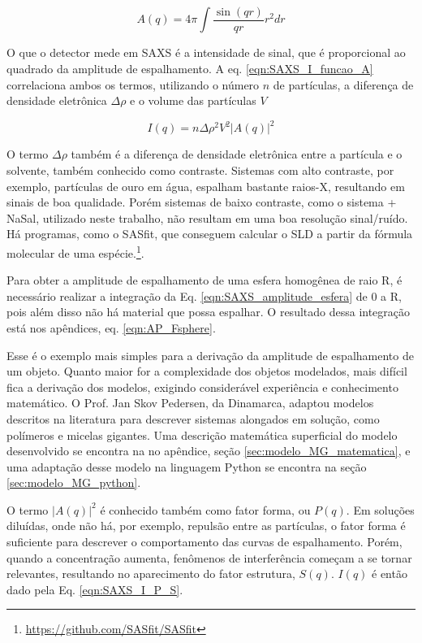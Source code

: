 		\begin{equation}
			A(q) = 4\pi \int \dfrac{\sin(qr)}{qr} r^2 dr
			\label{eqn:SAXS_amplitude_esfera}
		\end{equation}
		
		O que o detector mede em SAXS é a intensidade de sinal, que é proporcional ao quadrado da amplitude de espalhamento. A eq. \ref{eqn:SAXS_I_funcao_A} correlaciona ambos os termos, utilizando o número \(n\) de partículas, a diferença de densidade eletrônica \(\Delta \rho\) e o volume das partículas \(V\)
		
		\begin{equation}
			I(q) = n\Delta \rho^2 V^2 |A(q)|^2
			\label{eqn:SAXS_I_funcao_A}
		\end{equation}
		
		O termo \(\Delta \rho\) também é a diferença de densidade eletrônica entre a partícula e o solvente, também conhecido como contraste. Sistemas com alto contraste, por exemplo, partículas de ouro em água, espalham bastante raios-X, resultando em sinais de boa qualidade. Porém sistemas de baixo contraste, como o sistema \CTAB{} + NaSal, utilizado neste trabalho, não resultam em uma boa resolução sinal/ruído. Há programas, como o SASfit, que conseguem calcular o SLD a partir da fórmula molecular de uma espécie.\footnote{\url{https://github.com/SASfit/SASfit}}.
		
		Para obter a amplitude de espalhamento de uma esfera homogênea de raio R, é necessário realizar a integração da Eq. \ref{eqn:SAXS_amplitude_esfera} de 0 a R, pois além disso não há material que possa espalhar. O resultado dessa integração está nos apêndices, eq. \ref{eqn:AP_Fsphere}.
		
		Esse é o exemplo mais simples para a derivação da amplitude de espalhamento de um objeto. Quanto maior for a complexidade dos objetos modelados, mais difícil fica a derivação dos modelos, exigindo considerável experiência e conhecimento matemático. O Prof. Jan Skov Pedersen, da Dinamarca, adaptou modelos descritos na literatura para descrever sistemas alongados em solução, como polímeros e micelas gigantes. Uma descrição matemática superficial do modelo desenvolvido se encontra na no apêndice, seção \ref{sec:modelo_MG_matematica}, e uma adaptação desse modelo na linguagem Python se encontra na seção \ref{sec:modelo_MG_python}.
		
		O termo \(|A(q)|^2\) é conhecido também como fator forma, ou \(P(q)\). Em soluções diluídas, onde não há, por exemplo, repulsão entre as partículas, o fator forma é suficiente para descrever o comportamento das curvas de espalhamento. Porém, quando a concentração aumenta, fenômenos de interferência começam a se tornar relevantes, resultando no aparecimento do fator estrutura, \(S(q)\). \(I(q)\) é então dado pela Eq. \ref{eqn:SAXS_I_P_S}.
		
